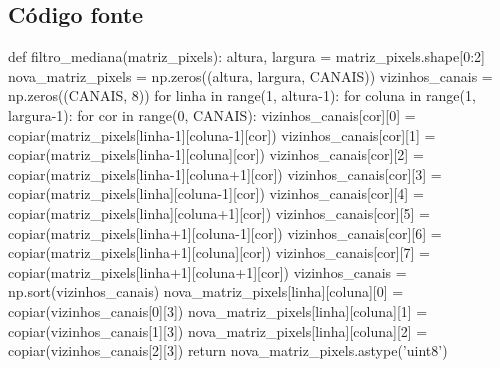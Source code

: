 \documentclass[a4paper,12pt]{article}
\begin{document}
\subsection{Código fonte}
\begin{python}
def filtro_mediana(matriz_pixels):
   altura, largura = matriz_pixels.shape[0:2]
   nova_matriz_pixels = np.zeros((altura, largura, CANAIS))
   vizinhos_canais = np.zeros((CANAIS, 8))
   for linha in range(1, altura-1):
     for coluna in range(1, largura-1):
        for cor in range(0, CANAIS):
          vizinhos_canais[cor][0] = copiar(matriz_pixels[linha-1][coluna-1][cor])
          vizinhos_canais[cor][1] = copiar(matriz_pixels[linha-1][coluna][cor])
          vizinhos_canais[cor][2] = copiar(matriz_pixels[linha-1][coluna+1][cor])
          vizinhos_canais[cor][3] = copiar(matriz_pixels[linha][coluna-1][cor])
          vizinhos_canais[cor][4] = copiar(matriz_pixels[linha][coluna+1][cor])
          vizinhos_canais[cor][5] = copiar(matriz_pixels[linha+1][coluna-1][cor])
          vizinhos_canais[cor][6] = copiar(matriz_pixels[linha+1][coluna][cor])
          vizinhos_canais[cor][7] = copiar(matriz_pixels[linha+1][coluna+1][cor])
        vizinhos_canais = np.sort(vizinhos_canais)
        nova_matriz_pixels[linha][coluna][0] = copiar(vizinhos_canais[0][3])
        nova_matriz_pixels[linha][coluna][1] = copiar(vizinhos_canais[1][3])
        nova_matriz_pixels[linha][coluna][2] = copiar(vizinhos_canais[2][3])
   return nova_matriz_pixels.astype('uint8')
\end{python}
\end{document}
